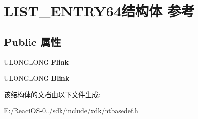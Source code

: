 \hypertarget{struct_l_i_s_t___e_n_t_r_y64}{}\section{L\+I\+S\+T\+\_\+\+E\+N\+T\+R\+Y64结构体 参考}
\label{struct_l_i_s_t___e_n_t_r_y64}
\subsection*{Public 属性}
\begin{DoxyCompactItemize}
\item 
\mbox{\label{struct_l_i_s_t___e_n_t_r_y64_a8f59f67432ac70daab2fa28e4530cb3f}} 
U\+L\+O\+N\+G\+L\+O\+NG {\bfseries Flink}
\item 
\mbox{\label{struct_l_i_s_t___e_n_t_r_y64_a07493a3e74133a0b559772adff9c74df}} 
U\+L\+O\+N\+G\+L\+O\+NG {\bfseries Blink}
\end{DoxyCompactItemize}


该结构体的文档由以下文件生成\+:\begin{DoxyCompactItemize}
\item 
E\+:/\+React\+O\+S-\/0../sdk/include/xdk/ntbasedef.\+h\end{DoxyCompactItemize}
